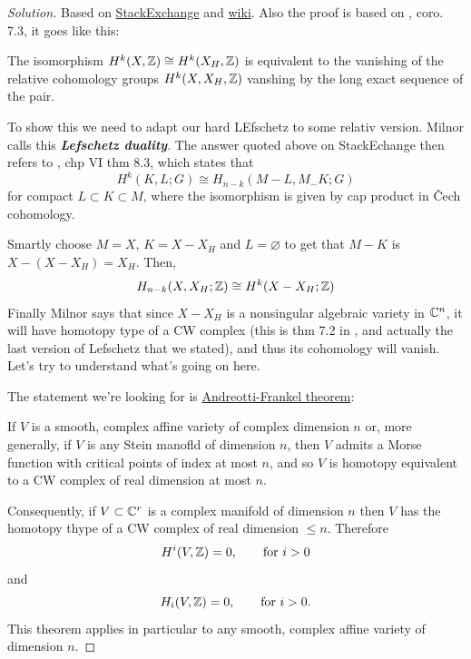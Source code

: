\begin{proof}[Solution]
	Based on \href{https://math.stackexchange.com/questions/712791/application-of-lefschetz-duality-to-prove-lefschetz-hyperplane-theorem}{StackExchange} and \href{https://en.wikipedia.org/wiki/Lefschetz_hyperplane_theorem}{wiki}. Also the proof is based on \cite{milnor}, coro. 7.3, it goes like this:

	The isomorphism $H^{k}(X,\mathbb{Z})\cong H^{k}(X_H,\mathbb{Z})$ is equivalent to the vanishing of the relative cohomology groups $ H^{k}(X,X_H,\mathbb{Z})$ vanshing by the long exact sequence of the pair.

	To show this we need to adapt our hard LEfschetz to some relativ version. Milnor calls this \textit{\textbf{Lefschetz duality}}. The answer quoted above on StackEchange then refers to \cite{bredon}, chp VI thm 8.3, which states that
\begin{equation*}
	H^{k}(K,L;G)\cong H_{n-k}(M-L,M_-K;G)
\end{equation*}
for compact $L\subset K\subset M$, where the isomorphism is given by cap product in \v Cech cohomology.

Smartly choose $M=X$, $K=X-X_H$ and $L=\varnothing$ to get that $M-K$ is $X-(X-X_H)=X_H$. Then,
\begin{equation*}
	H_{n-k}(X,X_H;\mathbb{Z})\cong H^{k}(X-X_H;\mathbb{Z})
\end{equation*}
Finally Milnor says that since $X-X_H$ is a nonsingular algebraic variety in $\mathbb{C}^n$, it will have homotopy type of a CW complex (this is thm 7.2 in \cite{milnor}, and actually the last version of Lefschetz that we stated), and thus its cohomology will vanish. Let's try to understand what's going on here.

The statement we're looking for is \href{https://en.wikipedia.org/wiki/Andreotti–Frankel_theorem}{Andreotti-Frankel theorem}:

\begin{thm}
	If $V$ is a smooth, complex affine variety of complex dimension $n$ or, more generally, if $V$ is any Stein manofld of dimension $n$, then $V$ admits a Morse function with critical points of index at most $n$, and so $V$ is homotopy equivalent to a CW complex of real dimension at most $n$. 
\end{thm}

Consequently, if $V\subset \mathbb{C}^{r}$ is a complex manifold of dimension $n$ then $V$ has the homotopy thype of a CW complex of real dimension $\le n$. Therefore
\begin{equation*}
	H^{i}(V,\mathbb{Z})=0,\qquad \text{for }i>0
\end{equation*}
and
\begin{equation*}
	H_{i}(V,\mathbb{Z})=0,\qquad\text{for }i>0.
\end{equation*}
This theorem applies in particular to any smooth, complex affine variety of dimension $n$.


\end{proof}

